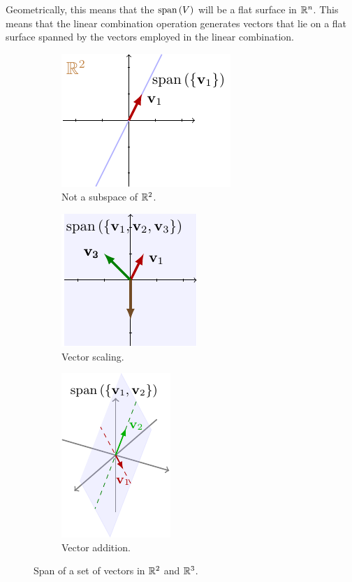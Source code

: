 Geometrically, this means that the $\text{span}\left( V\right)$ will be a flat surface in $\mathbb{R}^n$. This means that the linear combination operation generates vectors that lie on a flat surface spanned by the vectors employed in the linear combination.

\begin{figure}[h]
    \centering
    \begin{subfigure}[b]{0.32\textwidth}
        \includegraphics{figure/chapter01/span(a).pdf}
        \caption{Not a subspace of $\mathbb{R}^2$.}
        \label{fig:ch01-span1}
    \end{subfigure}
    \begin{subfigure}[b]{0.32\textwidth}
        \centering
        \includegraphics{figure/chapter01/span(b).pdf}
        \caption{Vector scaling.}
        \label{fig:ch01-span2}
    \end{subfigure}
    \begin{subfigure}[b]{0.32\textwidth}
        \centering
        \includegraphics{figure/chapter01/span(c).pdf}
        \caption{Vector addition.}
        \label{fig:ch01-span3}
    \end{subfigure}
    \caption{Span of a set of vectors in $\mathbb{R}^2$ and $\mathbb{R}^3$.}
\end{figure}

